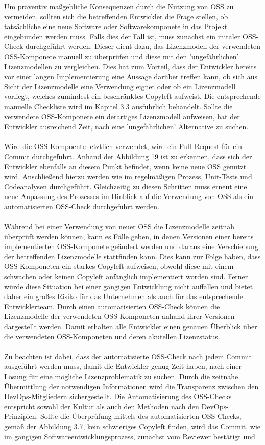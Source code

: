 Um präventiv maßgebliche Konsequenzen durch die Nutzung von OSS zu vermeiden, sollten sich die betreffenden Entwickler die Frage stellen, ob tatsächliche eine neue Software oder Softwarekomponete in das Projekt eingebunden werden muss. Falls dies der Fall ist, muss zunächst ein initaler OSS-Check durchgeführt werden. Dieser dient dazu, das Lizenzmodell der verwendeten OSS-Komponete manuell zu überprüfen und diese mit den 'ungefährlichen' Lizenzmodellen zu vergleichen. Dies hat zum Vorteil, dass der Entwickler bereits vor einer langen Implementierung eine Aussage darüber treffen kann, ob sich aus Sicht der Lizenzmodelle eine Verwendung eignet oder ob ein Lizenzmodell vorliegt, welches zumindest ein beschränktes Copyleft aufweist. Die entsprechende manuelle Checkliste wird im Kapitel 3.3 ausführlich behandelt. Sollte die verwendete OSS-Komponete ein derartiges Lizenzmodell aufweisen, hat der Entwickler ausreichend Zeit, nach eine 'ungefährlichen' Alternative zu suchen.\\\\ Wird die OSS-Kompoente letztlich verwendet, wird ein Pull-Request für ein Commit durchgeführt. Anhand der Abbildung 19 ist zu erkennen, dass sich der Entwickler ebenfalls an diesem Punkt befindet, wenn keine neue OSS genutzt wird. Anschließend hierzu werden wie im regelmäßigen Prozess, Unit-Tests und Codeanalysen durchgeführt. Gleichzeitig zu diesen Schritten muss erneut eine neue Anpassung des Prozesses im Hinblick auf die Verwendung von OSS als ein automatisierten OSS-Check durchgeführt werden.\\\\ Während bei einer Verwendung von neuer OSS die Lizenzmodelle zeitnah überprüft werden können, kann es Fälle geben, in denen Versionen einer bereits implementierten OSS-Komponete geändert werden und daraus eine Verschiebung der betreffenden Lizenzmodelle stattfinden kann. Dies kann zur Folge haben, dass OSS-Komponeten ein starkes Copyleft aufweisen, obwohl diese mit einem schwachen oder keinen Copyleft anfänglich implementiert worden sind. Ferner würde diese Situation bei einer gängigen Entwicklung nicht auffallen und bietet daher ein großes Risiko für das Unternehmen als auch für das entsprechende Entwicklerteam. Durch einen automatisierten OSS-Check können die Lizenzmodelle der verwendeten OSS-Komponeten anhand ihrer Versionen dargestellt werden. Damit erhalten alle Entwickler einen genauen Überblick über die verwendeten OSS-Komponeten und deren akutellen Lizenzstatus.\\\\ Zu beachten ist dabei, dass der automatisierte OSS-Check nach jedem Commit ausgeführt werden muss, damit die Entwickler genug Zeit haben, nach einer Lösung für eine mögliche Lizenzproblematik zu suchen. Durch die zeitnahe Übermittlung der notwendigen Informationen wird die Transparenz zwischen den DevOps-Mitgliedern sichergestellt. Die Automatisierung des OSS-Checks entspricht sowohl der Kultur als auch den Methoden nach den DevOps-Prinzipien. Sollte die Überprüfung mittels des automatisierten OSS-Checks, gemäß der Abbildung 3.7, kein schwieriges Copyleft finden, wird das Commit, wie im gängigen Softwareentwicklungsprozess, zunächst vom Reviewer bestätigt und 